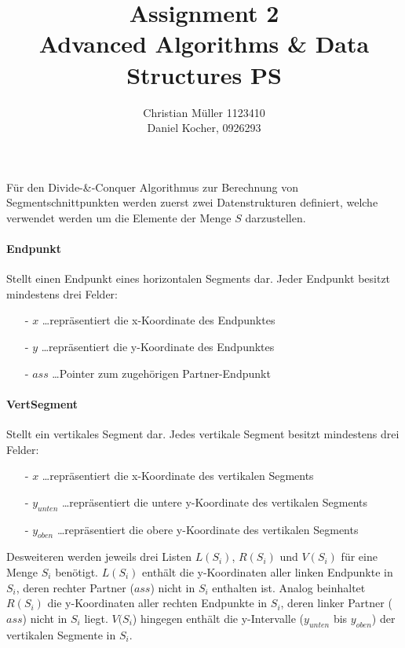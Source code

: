 \documentclass{article}
\begin{document}
%
\title{Assignment 2 \\ Advanced Algorithms \& Data Structures PS}%
\author{Christian Müller 1123410 \\ Daniel Kocher, 0926293}%
\maketitle%
\clearpage%
%
\noindent
F{\"u}r den Divide-\&-Conquer Algorithmus zur Berechnung von Segmentschnittpunkten
werden zuerst zwei Datenstrukturen definiert, welche verwendet werden um die
Elemente der Menge $S$ darzustellen.

\paragraph{Endpunkt}
Stellt einen Endpunkt eines horizontalen Segments dar.
Jeder Endpunkt besitzt mindestens drei Felder:
\begin{itemize}
  \item[-] $x$ \ldots repr{\"a}sentiert die x-Koordinate des Endpunktes
  \item[-] $y$ \ldots repr{\"a}sentiert die y-Koordinate des Endpunktes
  \item[-] $ass$ \ldots Pointer zum zugeh{\"o}rigen Partner-Endpunkt
\end{itemize}

\paragraph{VertSegment}
Stellt ein vertikales Segment dar. Jedes vertikale Segment besitzt mindestens
drei Felder:
\begin{itemize}
  \item[-] $x$ \ldots repr{\"a}sentiert die x-Koordinate des vertikalen Segments
  \item[-] $y_{unten}$ \ldots repr{\"a}sentiert die untere y-Koordinate des
    vertikalen Segments
  \item[-] $y_{oben}$ \ldots repr{\"a}sentiert die obere y-Koordinate des
    vertikalen Segments
\end{itemize}
%
Desweiteren werden jeweils drei Listen $L(S_i)$, $R(S_i)$ und $V(S_i)$ f{\"u}r
eine Menge $S_i$ ben{\"o}tigt. $L(S_i)$ enth{\"a}lt die y-Koordinaten aller linken
Endpunkte in $S_i$, deren rechter Partner ($ass$) nicht in $S_i$ enthalten ist.
Analog beinhaltet $R(S_i)$ die y-Koordinaten aller rechten Endpunkte in $S_i$,
deren linker Partner ($ass$) nicht in $S_i$ liegt. $V(S_i$) hingegen enth{\"a}lt
die y-Intervalle ($y_{unten}$ bis $y_{oben}$) der vertikalen Segmente in $S_i$.
\end{document}
